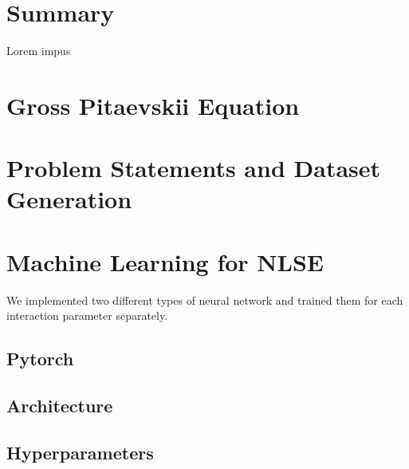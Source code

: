 \documentclass[a4paper,times,12pt]{article}
\title{}%
\date{}
\begin{document}
\setcounter{page}{1}

\section*{Summary}
Lorem impus

\section{Gross Pitaevskii Equation}
\section{Problem Statements and Dataset Generation}
\section{Machine Learning for NLSE}

We implemented two different types of neural network and trained them for each interaction parameter separately.


\subsection{Pytorch}
\subsection{Architecture}
\subsection{Hyperparameters}


\newpage
\end{document}
